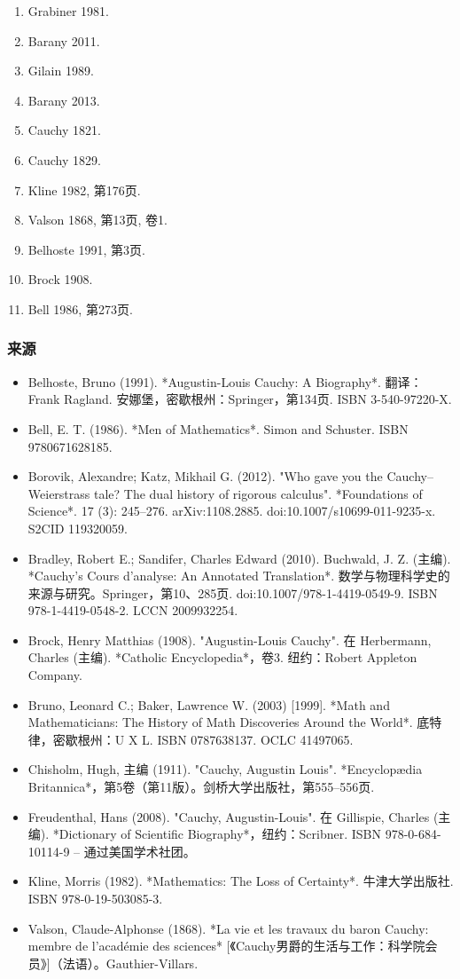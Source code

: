 \begin{enumerate}
\item Grabiner 1981.
\item Barany 2011.
\item Gilain 1989.
\item Barany 2013.
\item Cauchy 1821.
\item Cauchy 1829.
\item Kline 1982, 第176页.
\item Valson 1868, 第13页, 卷1.
\item Belhoste 1991, 第3页.
\item Brock 1908.
\item Bell 1986, 第273页.
\end{enumerate}
\subsubsection{来源}
\begin{itemize}
\item Belhoste, Bruno (1991). *Augustin-Louis Cauchy: A Biography*. 翻译：Frank Ragland. 安娜堡，密歇根州：Springer，第134页. ISBN 3-540-97220-X.
\item Bell, E. T. (1986). *Men of Mathematics*. Simon and Schuster. ISBN 9780671628185.
\item Borovik, Alexandre; Katz, Mikhail G. (2012). "Who gave you the Cauchy–Weierstrass tale? The dual history of rigorous calculus". *Foundations of Science*. 17 (3): 245–276. arXiv:1108.2885. doi:10.1007/s10699-011-9235-x. S2CID 119320059.
\item Bradley, Robert E.; Sandifer, Charles Edward (2010). Buchwald, J. Z. (主编). *Cauchy's Cours d'analyse: An Annotated Translation*. 数学与物理科学史的来源与研究。Springer，第10、285页. doi:10.1007/978-1-4419-0549-9. ISBN 978-1-4419-0548-2. LCCN 2009932254.
\item Brock, Henry Matthias (1908). "Augustin-Louis Cauchy". 在 Herbermann, Charles (主编). *Catholic Encyclopedia*，卷3. 纽约：Robert Appleton Company.
\item Bruno, Leonard C.; Baker, Lawrence W. (2003) [1999]. *Math and Mathematicians: The History of Math Discoveries Around the World*. 底特律，密歇根州：U X L. ISBN 0787638137. OCLC 41497065.
\item Chisholm, Hugh, 主编 (1911). "Cauchy, Augustin Louis". *Encyclopædia Britannica*，第5卷（第11版）。剑桥大学出版社，第555–556页.
\item Freudenthal, Hans (2008). "Cauchy, Augustin-Louis". 在 Gillispie, Charles (主编). *Dictionary of Scientific Biography*，纽约：Scribner. ISBN 978-0-684-10114-9 – 通过美国学术社团。
\item Kline, Morris (1982). *Mathematics: The Loss of Certainty*. 牛津大学出版社. ISBN 978-0-19-503085-3.
\item Valson, Claude-Alphonse (1868). *La vie et les travaux du baron Cauchy: membre de l'académie des sciences* [《Cauchy男爵的生活与工作：科学院会员》]（法语）。Gauthier-Villars.
\end{itemize}
  